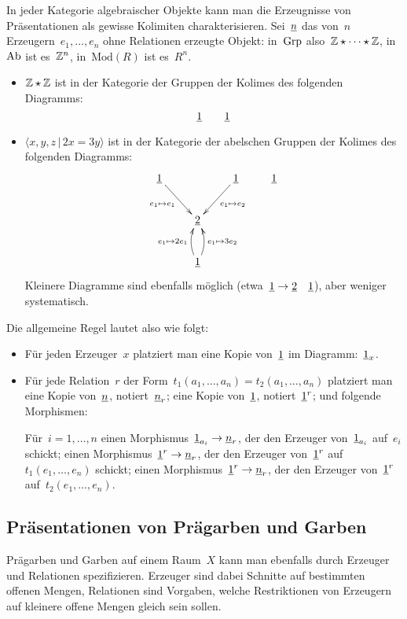 \documentclass{uebblatt}
\begin{document}
In jeder Kategorie algebraischer Objekte kann man die Erzeugnisse von
Präsentationen als gewisse Kolimiten charakterisieren. Sei~$\underline{n}$ das von~$n$
Erzeugern~$e_1,\ldots,e_n$ ohne Relationen erzeugte Objekt: in~$\mathrm{Grp}$ also~$\mathbb{Z}
\star \cdots \star \mathbb{Z}$, in~$\mathrm{Ab}$ ist es~$\mathbb{Z}^n$, in~$\mathrm{Mod}(R)$ ist
es~$R^n$.

\begin{itemize}
\item $\mathbb{Z} \star \mathbb{Z}$ ist in der Kategorie der Gruppen der Kolimes des
folgenden Diagramms:
\[ \underline{1} \qquad \underline{1} \]
\item $\langle x,y,z \,|\, 2x = 3y \rangle$ ist in der Kategorie der abelschen
Gruppen der Kolimes des folgenden Diagramms:
\[ \xymatrix{
  \ul{1} \ar[rd]_{e_1 \mapsto e_1} && \ul{1} \ar[ld]^{e_1 \mapsto e_2} & \ul{1} \\
  & \ul{2} \\
  & \ul{1} \ar@/^/[u]^{e_1 \mapsto 2e_1} \ar@/_/[u]_{e_1 \mapsto 3e_2}
} \]
Kleinere Diagramme sind ebenfalls möglich (etwa~$\underline{1} \to \underline{2} \quad
\underline{1}$), aber weniger systematisch.
\end{itemize}

Die allgemeine Regel lautet also wie folgt:
\begin{itemize}
\item Für jeden Erzeuger~$x$ platziert man eine Kopie von~$\underline{1}$ im
Diagramm:~$\underline{1}_x$.
\item Für jede Relation~$r$ der Form~$t_1(a_1,\ldots,a_n) =
t_2(a_1,\ldots,a_n)$ platziert man eine Kopie von~$\underline{n}$,
notiert~$\underline{n}_r$; eine Kopie von~$\underline{1}$, notiert~$\underline{1}^r$; und
folgende Morphismen:

Für~$i=1,\ldots,n$ einen Morphismus~$\underline{1}_{a_i} \to \underline{n}_r$, der
den Erzeuger von~$\underline{1}_{a_i}$ auf~$e_i$ schickt; einen
Morphismus~$\underline{1}^r \to \underline{n}_r$, der den Erzeuger von~$\underline{1}^r$
auf~$t_1(e_1,\ldots,e_n)$ schickt; einen Morphismus~$\underline{1}^r \to \underline{n}_r$,
der den Erzeuger von~$\underline{1}^r$ auf~$t_2(e_1,\ldots,e_n)$.
\end{itemize}


\subsection*{Präsentationen von Prägarben und Garben}

Prägarben und Garben auf einem Raum~$X$ kann man ebenfalls durch
Erzeuger und Relationen spezifizieren. Erzeuger sind dabei Schnitte auf
bestimmten offenen Mengen, Relationen sind Vorgaben, welche Restriktionen von
Erzeugern auf kleinere offene Mengen gleich sein sollen.
\end{document}
